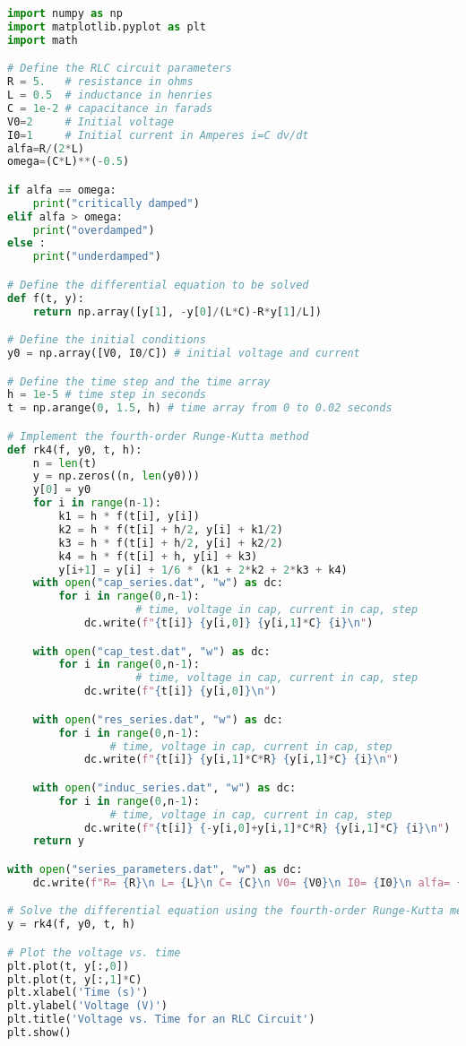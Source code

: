 \begin{code}\begin{lstlisting}[language=python,caption={Python code that approximated the function of the voltage and current for a discharging RLC series circuit. }, label=cd:fortran_gral]
import numpy as np
import matplotlib.pyplot as plt
import math

# Define the RLC circuit parameters
R = 5.   # resistance in ohms
L = 0.5  # inductance in henries
C = 1e-2 # capacitance in farads
V0=2     # Initial voltage
I0=1     # Initial current in Amperes i=C dv/dt
alfa=R/(2*L)
omega=(C*L)**(-0.5)

if alfa == omega:
    print("critically damped")
elif alfa > omega:
    print("overdamped")
else :
    print("underdamped")

# Define the differential equation to be solved
def f(t, y):
    return np.array([y[1], -y[0]/(L*C)-R*y[1]/L])

# Define the initial conditions
y0 = np.array([V0, I0/C]) # initial voltage and current

# Define the time step and the time array
h = 1e-5 # time step in seconds
t = np.arange(0, 1.5, h) # time array from 0 to 0.02 seconds

# Implement the fourth-order Runge-Kutta method
def rk4(f, y0, t, h):
    n = len(t)
    y = np.zeros((n, len(y0)))
    y[0] = y0
    for i in range(n-1):
        k1 = h * f(t[i], y[i])
        k2 = h * f(t[i] + h/2, y[i] + k1/2)
        k3 = h * f(t[i] + h/2, y[i] + k2/2)
        k4 = h * f(t[i] + h, y[i] + k3)
        y[i+1] = y[i] + 1/6 * (k1 + 2*k2 + 2*k3 + k4)
    with open("cap_series.dat", "w") as dc:
        for i in range(0,n-1):
                    # time, voltage in cap, current in cap, step
            dc.write(f"{t[i]} {y[i,0]} {y[i,1]*C} {i}\n")

    with open("cap_test.dat", "w") as dc:
        for i in range(0,n-1):
                    # time, voltage in cap, current in cap, step
            dc.write(f"{t[i]} {y[i,0]}\n")

    with open("res_series.dat", "w") as dc:
        for i in range(0,n-1):
                # time, voltage in cap, current in cap, step
            dc.write(f"{t[i]} {y[i,1]*C*R} {y[i,1]*C} {i}\n")

    with open("induc_series.dat", "w") as dc:
        for i in range(0,n-1):
                # time, voltage in cap, current in cap, step
            dc.write(f"{t[i]} {-y[i,0]+y[i,1]*C*R} {y[i,1]*C} {i}\n")
    return y

with open("series_parameters.dat", "w") as dc:
    dc.write(f"R= {R}\n L= {L}\n C= {C}\n V0= {V0}\n I0= {I0}\n alfa= {alfa}\n omega= {omega}\n ")

# Solve the differential equation using the fourth-order Runge-Kutta method
y = rk4(f, y0, t, h)

# Plot the voltage vs. time
plt.plot(t, y[:,0])
plt.plot(t, y[:,1]*C)
plt.xlabel('Time (s)')
plt.ylabel('Voltage (V)')
plt.title('Voltage vs. Time for an RLC Circuit')
plt.show()

\end{lstlisting}
\end{code}
